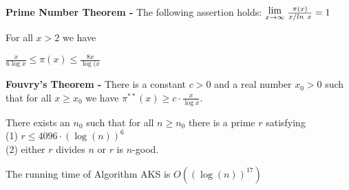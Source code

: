\documentclass[a4paper]{article}
\newcommand{\Lim}[1]{\raisebox{0.5ex}{{$\displaystyle \lim_{#1}\;$}}}
\begin{document}
\begin{theorem}
\textbf{Prime Number Theorem -} The following assertion holds: $\Lim{x \to \infty}{\frac{\pi (x)}{x/ ln\ x}} = 1$
\end{theorem}


\begin{theorem}
For all $x > 2$ we have 
\begin{center}
$\frac{x}{6\log{x}} \leq \pi (x) \leq \frac{8x}{\log(x}$
\end{center}
\end{theorem}


\begin{theorem}
\textbf{Fouvry's Theorem -} There is a constant $c > 0$ and a real number $x_{0} > 0 $ such that for all $x \geq x_{0}$ we have $\pi^{**} (x) \geq c \cdot \frac{x}{\log{x}}$.
\end{theorem}


\begin{lemma}
There exists an $n_{0}$ such that for all $n \geq n_{0}$ there is a prime $r$ satisfying\\
(1) $r \leq 4096 \cdot (\log(n))^{6}$ \\
(2) either $r$ divides $n$ or $r$ is $n$-good.
\end{lemma}


\begin{theorem}
The running time of Algorithm AKS is $O\left( (\log(n))^{17} \right)$
\end{theorem}
\end{document}
